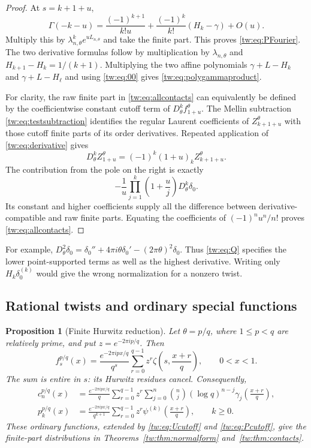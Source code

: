 \documentclass[11pt,letterpaper]{article}
\numberwithin{equation}{section}
\theoremstyle{plain}
\newtheorem{proposition}[theorem]{Proposition}
\theoremstyle{definition}
\theoremstyle{remark}
\begin{document}
\begin{proof}
At $s=k+1+u$,
\[
 \Gamma(-k-u)
 =\frac{(-1)^{k+1}}{k!u}
       +\frac{(-1)^k}{k!}(H_k-\gamma)+O(u).
\]
Multiply this by
$\lambda_{n,\theta}^ke^{uL_{n,\theta}}$ and take the finite part.
This proves \eqref{tw:eq:PFourier}. The two derivative formulas
follow by multiplication by $\lambda_{n,\theta}$ and
$H_{k+1}-H_k=1/(k+1)$. Multiplying the two affine polynomials
$\gamma+L-H_k$ and $\gamma+L-H_\ell$ and using
\eqref{tw:eq:00} gives \eqref{tw:eq:polygammaproduct}.

For clarity, the raw finite part in \eqref{tw:eq:allcontacts} can
equivalently be defined by the coefficientwise constant cutoff term
of $D_\theta^kf_{1+u}^\theta$. The Mellin subtraction
\eqref{tw:eq:testsubtraction} identifies the regular Laurent
coefficients of $Z_{k+1+u}^\theta$ with those cutoff finite parts
of its order derivatives. Repeated application of
\eqref{tw:eq:derivative} gives
\[
 D_\theta^kZ_{1+u}^\theta
          =(-1)^k(1+u)_kZ_{k+1+u}^\theta.
\]
The contribution from the pole on the right is exactly
\[
 -\frac{1}{u}\prod_{j=1}^k\left(1+\frac{u}{j}\right)
                  D_\theta^k\delta_0.
\]
Its constant and higher coefficients supply all the difference
between derivative-compatible and raw finite parts. Equating
the coefficients of $(-1)^nu^n/n!$ proves
\eqref{tw:eq:allcontacts}.
\end{proof}

For example, $D_\theta^2\delta_0=\delta_0''+
4\pi i\theta\delta_0'-(2\pi\theta)^2\delta_0$. Thus
\eqref{tw:eq:Q} specifies the lower point-supported terms as well
as the highest derivative. Writing only $H_k\delta_0^{(k)}$ would
give the wrong normalization for a nonzero twist.

\subsection{Rational twists and ordinary special functions}

\begin{proposition}[Finite Hurwitz reduction]\label{tw:prop:rational}
Let $\theta=p/q$, where $1\le p<q$ are relatively prime, and put
$z=e^{-2\pi ip/q}$. Then
\begin{equation}\label{tw:eq:rationalLerch}
 f_s^{p/q}(x)=\frac{e^{-2\pi ipx/q}}{q^s}
          \sum_{r=0}^{q-1}z^r\zeta\left(s,\frac{x+r}{q}\right),
 \qquad 0<x<1.
\end{equation}
The sum is entire in $s$: its Hurwitz residues cancel. Consequently,
\begin{align}
 c_n^{p/q}(x)
 &=\frac{e^{-2\pi ipx/q}}q
       \sum_{r=0}^{q-1}z^r\sum_{j=0}^n\binom nj
        (\log q)^{n-j}\gamma_j\left(\frac{x+r}{q}\right),
 \label{tw:eq:rationalStieltjes}\\
 p_k^{p/q}(x)
 &=\frac{e^{-2\pi ipx/q}}{q^{k+1}}
       \sum_{r=0}^{q-1}z^r\psi^{(k)}\left(\frac{x+r}{q}\right),
       \qquad k\ge0.\label{tw:eq:rationalPolygamma}
\end{align}
These ordinary functions, extended by
\eqref{tw:eq:Ucutoff} and \eqref{tw:eq:Pcutoff}, give the
finite-part distributions in Theorems~\ref{tw:thm:normalform}
and~\ref{tw:thm:contacts}.
\end{proposition}
\end{document}
